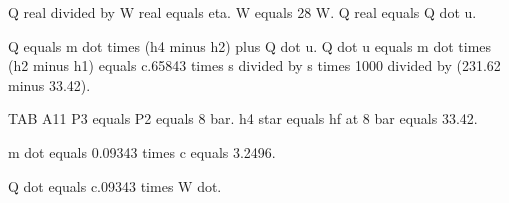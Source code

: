 Q real divided by W real equals eta.
W equals 28 W.
Q real equals Q dot u.

Q equals m dot times (h4 minus h2) plus Q dot u.
Q dot u equals m dot times (h2 minus h1) equals c.65843 times s divided by s times 1000 divided by (231.62 minus 33.42).

TAB A11
P3 equals P2 equals 8 bar.
h4 star equals hf at 8 bar equals 33.42.

m dot equals 0.09343 times c equals 3.2496.

Q dot equals c.09343 times W dot.